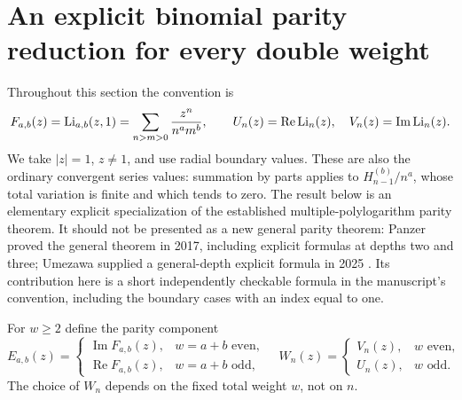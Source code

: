 
\section{An explicit binomial parity reduction for every double weight}
\label{sec:double-parity}

Throughout this section the convention is
\[
 F_{a,b}(z)=\operatorname{Li}_{a,b}(z,1)
   =\sum_{n>m>0}\frac{z^n}{n^a m^b},\qquad
 U_n(z)=\operatorname{Re}\operatorname{Li}_n(z),\quad
 V_n(z)=\operatorname{Im}\operatorname{Li}_n(z).
\]
We take $|z|=1$, $z\ne1$, and use radial boundary values. These are also
the ordinary convergent series values: summation by parts applies to
$H_{n-1}^{(b)}/n^a$, whose total variation is finite and which tends to zero.
The result below is an elementary explicit specialization of the established
multiple-polylogarithm parity theorem. It should not be presented as a new
general parity theorem: Panzer proved the general theorem in 2017, including
explicit formulas at depths two and three; Umezawa supplied a general-depth
explicit formula in 2025 \cite{Panzer,Umezawa}. Its contribution here
is a short independently checkable formula in the manuscript's convention,
including the boundary cases with an index equal to one.

For $w\ge2$ define the parity component
\[
 E_{a,b}(z)=
 \begin{cases}
 \operatorname{Im}F_{a,b}(z),&w=a+b\text{ even},\\
 \operatorname{Re}F_{a,b}(z),&w=a+b\text{ odd},
 \end{cases}
\quad
 W_n(z)=
 \begin{cases}V_n(z),&w\text{ even},\\U_n(z),&w\text{ odd}.
 \end{cases}
\]
The choice of $W_n$ depends on the fixed total weight $w$, not on $n$.

